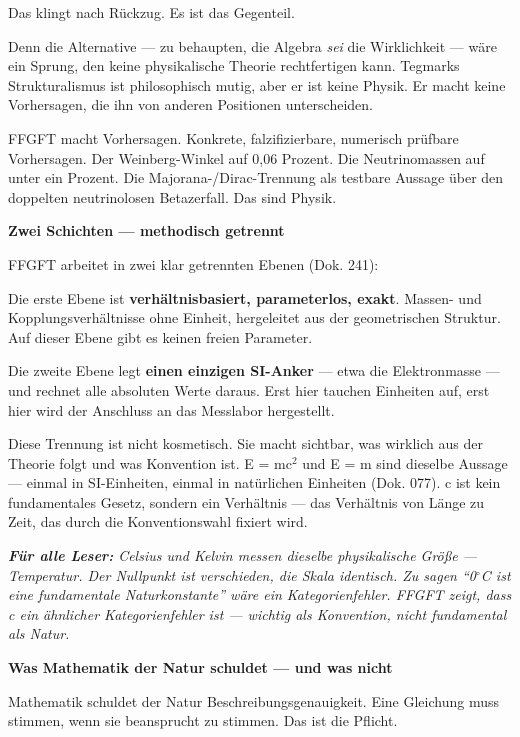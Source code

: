 \documentclass[11pt,oneside]{book}
\newenvironment{laierspur}{%
  \par\vspace{4pt}%
  \noindent\small\itshape\color{blue!60!black}%
  \textbf{Für alle Leser:}\enspace\ignorespaces}{%
  \par\vspace{4pt}\normalsize\normalfont\normalcolor}
\begin{document}
Das klingt nach Rückzug. Es ist das Gegenteil.


Denn die Alternative — zu behaupten, die Algebra \textit{sei} die Wirklichkeit —
wäre ein Sprung, den keine physikalische Theorie rechtfertigen kann. Tegmarks
Strukturalismus ist philosophisch mutig, aber er ist keine Physik. Er macht
keine Vorhersagen, die ihn von anderen Positionen unterscheiden.


FFGFT macht Vorhersagen. Konkrete, falzifizierbare, numerisch prüfbare
Vorhersagen. Der Weinberg-Winkel auf 0,06 Prozent. Die Neutrinomassen auf
unter ein Prozent. Die Majorana-/Dirac-Trennung als testbare Aussage über
den doppelten neutrinolosen Betazerfall. Das sind Physik.


\textbf{Zwei Schichten — methodisch getrennt}


FFGFT arbeitet in zwei klar getrennten Ebenen (Dok. 241):


Die erste Ebene ist \textbf{verhältnisbasiert, parameterlos, exakt}. Massen- und
Kopplungsverhältnisse ohne Einheit, hergeleitet aus der geometrischen
Struktur. Auf dieser Ebene gibt es keinen freien Parameter.


Die zweite Ebene legt \textbf{einen einzigen SI-Anker} — etwa die Elektronmasse
— und rechnet alle absoluten Werte daraus. Erst hier tauchen Einheiten auf,
erst hier wird der Anschluss an das Messlabor hergestellt.


Diese Trennung ist nicht kosmetisch. Sie macht sichtbar, was wirklich aus
der Theorie folgt und was Konvention ist. E = mc$^2$ und E = m sind dieselbe
Aussage — einmal in SI-Einheiten, einmal in natürlichen Einheiten (Dok. 077).
c ist kein fundamentales Gesetz, sondern ein Verhältnis — das Verhältnis
von Länge zu Zeit, das durch die Konventionswahl fixiert wird.


\begin{laierspur}
Celsius und Kelvin messen dieselbe physikalische Größe —
Temperatur. Der Nullpunkt ist verschieden, die Skala identisch. Zu sagen
\enquote{0$^\circ$C ist eine fundamentale Naturkonstante} wäre ein Kategorienfehler.
FFGFT zeigt, dass c ein ähnlicher Kategorienfehler ist — wichtig als
Konvention, nicht fundamental als Natur.
\end{laierspur}

\textbf{Was Mathematik der Natur schuldet — und was nicht}


Mathematik schuldet der Natur Beschreibungsgenauigkeit. Eine Gleichung muss
stimmen, wenn sie beansprucht zu stimmen. Das ist die Pflicht.
\end{document}
